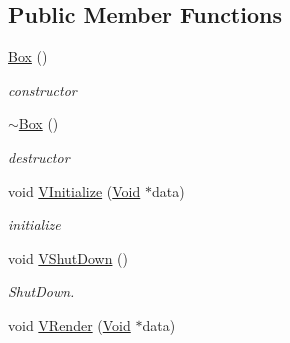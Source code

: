 \subsection*{Public Member Functions}
\begin{DoxyCompactItemize}
\item 
\hypertarget{classContent_1_1Shape_1_1Admin_1_1Box_a205c3018ed52129770a239dadd09de8c}{
\hyperlink{classContent_1_1Shape_1_1Admin_1_1Box_a205c3018ed52129770a239dadd09de8c}{Box} ()}
\label{classContent_1_1Shape_1_1Admin_1_1Box_a205c3018ed52129770a239dadd09de8c}

\begin{DoxyCompactList}\small\item\em constructor \item\end{DoxyCompactList}\item 
\hypertarget{classContent_1_1Shape_1_1Admin_1_1Box_aa99b60140d419e654635c91c1108adc6}{
\hyperlink{classContent_1_1Shape_1_1Admin_1_1Box_aa99b60140d419e654635c91c1108adc6}{$\sim$Box} ()}
\label{classContent_1_1Shape_1_1Admin_1_1Box_aa99b60140d419e654635c91c1108adc6}

\begin{DoxyCompactList}\small\item\em destructor \item\end{DoxyCompactList}\item 
\hypertarget{classContent_1_1Shape_1_1Admin_1_1Box_aa961111d4718bb498ab6e488aa8a90c4}{
void \hyperlink{classContent_1_1Shape_1_1Admin_1_1Box_aa961111d4718bb498ab6e488aa8a90c4}{VInitialize} (\hyperlink{structVoid}{Void} $\ast$data)}
\label{classContent_1_1Shape_1_1Admin_1_1Box_aa961111d4718bb498ab6e488aa8a90c4}

\begin{DoxyCompactList}\small\item\em initialize \item\end{DoxyCompactList}\item 
\hypertarget{classContent_1_1Shape_1_1Admin_1_1Box_ab88e99a32443ed23ab403939dea5002c}{
void \hyperlink{classContent_1_1Shape_1_1Admin_1_1Box_ab88e99a32443ed23ab403939dea5002c}{VShutDown} ()}
\label{classContent_1_1Shape_1_1Admin_1_1Box_ab88e99a32443ed23ab403939dea5002c}

\begin{DoxyCompactList}\small\item\em ShutDown. \item\end{DoxyCompactList}\item 
\hypertarget{classContent_1_1Shape_1_1Admin_1_1Box_adb317c94fec3df51704e43cd4c00f7c0}{
void \hyperlink{classContent_1_1Shape_1_1Admin_1_1Box_adb317c94fec3df51704e43cd4c00f7c0}{VRender} (\hyperlink{structVoid}{Void} $\ast$data)}
\label{classContent_1_1Shape_1_1Admin_1_1Box_adb317c94fec3df51704e43cd4c00f7c0}


\end{DoxyCompactItemize}
